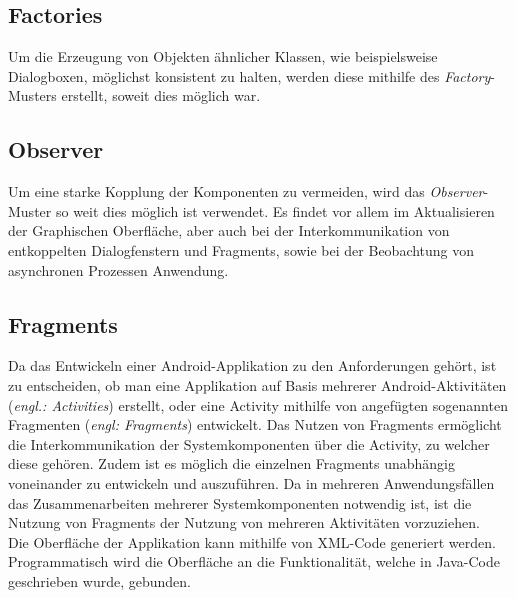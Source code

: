 \documentclass[oneside]{ausarbeitung}
\begin{document}
\subsection{Factories}
Um die Erzeugung von Objekten ähnlicher Klassen, wie beispielsweise Dialogboxen, möglichst konsistent zu halten, werden diese mithilfe des \textit{Factory}-Musters erstellt, soweit dies möglich war.

\subsection{Observer}
Um eine starke Kopplung der Komponenten zu vermeiden, wird das \textit{Observer}-Muster so weit dies möglich ist verwendet. Es findet vor allem im Aktualisieren der Graphischen Oberfläche, aber auch bei der Interkommunikation von entkoppelten Dialogfenstern und Fragments, sowie bei der Beobachtung von asynchronen Prozessen Anwendung.

\subsection{Fragments}
Da das Entwickeln einer Android-Applikation zu den Anforderungen gehört, ist zu entscheiden, ob man eine Applikation auf Basis mehrerer Android-Aktivitäten  (\textit{engl.: Activities}) erstellt, oder eine Activity mithilfe von angefügten sogenannten Fragmenten (\textit{engl: Fragments}) entwickelt. Das Nutzen von Fragments ermöglicht die Interkommunikation der Systemkomponenten über die Activity, zu welcher diese gehören. Zudem ist es möglich die einzelnen Fragments unabhängig voneinander zu entwickeln und auszuführen. Da in mehreren Anwendungsfällen das Zusammenarbeiten mehrerer Systemkomponenten notwendig ist, ist die Nutzung von Fragments der Nutzung von mehreren Aktivitäten vorzuziehen.\\
Die Oberfläche der Applikation kann mithilfe von XML-Code generiert werden. Programmatisch wird die Oberfläche an die Funktionalität, welche in Java-Code geschrieben wurde, gebunden.\\
\end{document}
